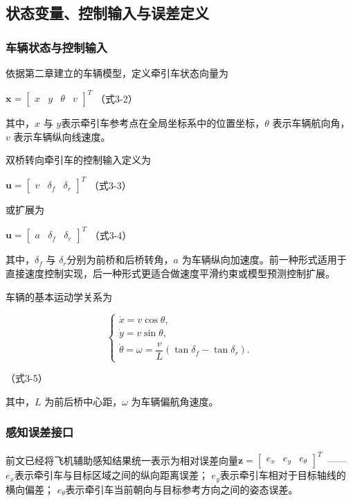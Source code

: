 \documentclass[UTF8,a4paper,12pt]{ctexart}
\begin{document}
\subsection{状态变量、控制输入与误差定义}\label{_Toc228997196}

\subsubsection{车辆状态与控制输入}\label{_Toc228997197}

依据第二章建立的车辆模型，定义牵引车状态向量为

\(\mathbf{x} = \begin{bmatrix}
x & y & \theta & v
\end{bmatrix}^{T}\) （式3-2）

其中，\(x\) 与 \(y\)表示牵引车参考点在全局坐标系中的位置坐标，\(\theta\) 表示车辆航向角，\(v\) 表示车辆纵向线速度。

双桥转向牵引车的控制输入定义为

\(\mathbf{u} = \begin{bmatrix}
v & \delta_{f} & \delta_{r}
\end{bmatrix}^{T}\) （式3-3）

或扩展为

\(\mathbf{u} = \begin{bmatrix}
a & \delta_{f} & \delta_{r}
\end{bmatrix}^{T}\) （式3-4）

其中，\(\delta_{f}\) 与 \(\delta_{r}\)分别为前桥和后桥转角，\(a\) 为车辆纵向加速度。前一种形式适用于直接速度控制实现，后一种形式更适合做速度平滑约束或模型预测控制扩展。

车辆的基本运动学关系为

\[
\begin{cases}
\dot{x}=v\cos\theta,\\
\dot{y}=v\sin\theta,\\
\dot{\theta}=\omega=\dfrac{v}{L}\left(\tan\delta_f-\tan\delta_r\right).
\end{cases}
\]

（式3-5）

其中，\(L\) 为前后桥中心距，\(\omega\) 为车辆偏航角速度。

\subsubsection{感知误差接口}\label{_Toc228997198}

前文已经将飞机辅助感知结果统一表示为相对误差向量\(\mathbf{z} = \begin{bmatrix}
e_{x} & e_{y} & e_{\theta}
\end{bmatrix}^{T}\) \(\ \)------\(e_{x}\)表示牵引车与目标区域之间的纵向距离误差； \(e_{y}\)表示牵引车相对于目标轴线的横向偏差； \(e_{\theta}\)表示牵引车当前朝向与目标参考方向之间的姿态误差。
\end{document}
